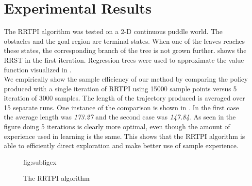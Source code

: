 \documentclass[wcp]{jmlr}
\begin{document}
\section{Experimental Results}
\label{sec:experiment}
The RRTPI algorithm was tested on a 2-D continuous puddle world. The obstacles and the goal region are terminal states. When one of the leaves reaches these states, the corresponding branch of the tree is not grown further.  shows the RRST in the first iteration. Regression trees were used to approximate the value function visualized in .\\
 We empirically show the sample efficiency of our method by comparing the policy produced with a single iteration of RRTPI using 15000 sample points versus 5 iteration of 3000 samples. The length of the trajectory produced is averaged over 15 separate runs. One instance of the comparison is shown in . In the first case the average length was \textit{173.27} and the second case was \textit{147.84}. As seen in the figure doing 5 iterations is clearly more optimal, even though the amount of experience used in learning is the same. This shows that the RRTPI algorithm is able to efficiently direct exploration and make better use of sample experience.
\begin{figure}[htbp]
\floatconts
  {fig:subfigex}
  {\caption{The RRTPI algorithm}}
  {%
    \qquad
  }
\end{figure}
\end{document}
